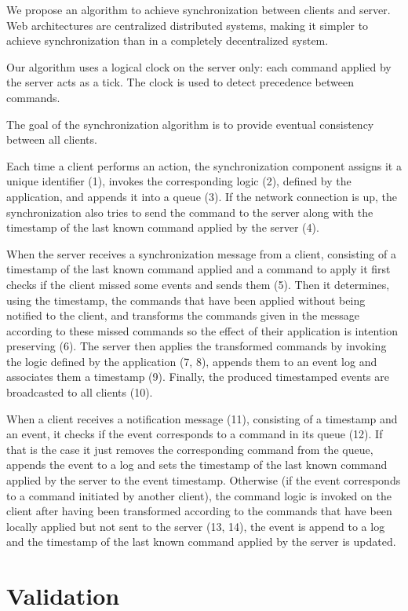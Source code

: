 \documentclass{acm_proc_article-sp}
\begin{document}
We propose an algorithm to achieve synchronization between clients and server. Web architectures are centralized distributed systems, making it simpler to achieve synchronization than in a completely decentralized system.

Our algorithm uses a logical clock on the server only: each command applied by the server acts as a tick. The clock is used to detect precedence between commands.

The goal of the synchronization algorithm is to provide eventual consistency between all clients.

Each time a client performs an action, the synchronization component assigns it a unique identifier (1), invokes the corresponding logic (2), defined by the application, and appends it into a queue (3). If the network connection is up, the synchronization also tries to send the command to the server along with the timestamp of the last known command applied by the server (4).

When the server receives a synchronization message from a client, consisting of a timestamp of the last known command applied and a command to apply it first checks if the client missed some events and sends them (5). Then it determines, using the timestamp, the commands that have been applied without being notified to the client, and transforms the commands given in the message according to these missed commands so the effect of their application is intention preserving (6). The server then applies the transformed commands by invoking the logic defined by the application (7, 8), appends them to an event log and associates them a timestamp (9). Finally, the produced timestamped events are broadcasted to all clients (10).

When a client receives a notification message (11), consisting of a timestamp and an event, it checks if the event corresponds to a command in its queue (12). If that is the case it just removes the corresponding command from the queue, appends the event to a log and sets the timestamp of the last known command applied by the server to the event timestamp. Otherwise (if the event corresponds to a command initiated by another client), the command logic is invoked on the client after having been transformed according to the commands that have been locally applied but not sent to the server (13, 14), the event is append to a log and the timestamp of the last known command applied by the server is updated.

\section{Validation}
\end{document}
